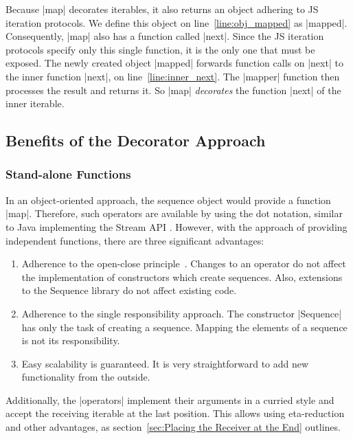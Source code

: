 Because |map| decorates iterables, it also returns an object adhering to JS
iteration protocols. We define this object on line~\ref{line:obj_mapped} as
|mapped|. Consequently, |map| also has a function called |next|. Since the JS
iteration protocols specify only this single function, it is the only one that
must be exposed. The newly created object |mapped| forwards function
calls on |next| to the inner function |next|, on line~\ref{line:inner_next}.
The |mapper| function then processes the result and returns it. So |map|
\textit{decorates} the function |next| of the inner iterable.

\subsection{Benefits of the Decorator Approach}
\label{sub:Benefits of the Decorator Approach}
\subsubsection{Stand-alone Functions}
\label{subsub:Standalone Functions}
In an object-oriented approach, the sequence object would provide a function
|map|. Therefore, such operators are available by using the dot notation,
similar to Java implementing the Stream API \cite{java_stream}.
However, with the approach of providing independent functions, there 
are three significant advantages:

\begin{enumerate}
  \item {Adherence to the open-close
      principle~\cite[p.~3]{eilebrecht_patterns_2019}. Changes to an operator
      do not affect the implementation of constructors which create sequences. Also,
      extensions to the Sequence library do not affect existing code.
    }
  \item{Adherence to the single responsibility approach. The constructor
    |Sequence| has only the task of creating a sequence. Mapping the elements
  of a sequence is not its responsibility. }
  \item{Easy scalability is guaranteed. It is very straightforward to add new
    functionality from the outside. }
\end{enumerate}

Additionally, the |operators| implement their arguments in a curried style and
accept the receiving iterable at the last position. This allows using
eta-reduction and other advantages, as section~\ref{sec:Placing the Receiver at the End} outlines.

